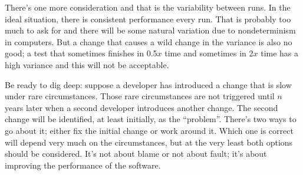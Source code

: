 There's one more consideration and that is the variability between runs. In the ideal situation, there is consistent performance every run. That is probably too much to ask for and there will be some natural variation due to nondeterminism in computers. But a change that causes a wild change in the variance is also no good; a test that sometimes finishes in 0.5$x$ time and sometimes in 2$x$ time has a high variance and this will not be acceptable. 

Be ready to dig deep: suppose a developer has introduced a change that is slow under rare circumstances. Those rare circumstances are not triggered until $n$ years later when a second developer introduces another change. The second change will be identified, at least initially, as the ``problem''. There's two ways to go about it; either fix the initial change or work around it. Which one is correct will depend very much on the circumstances, but at the very least both options should be considered. It's not about blame or not about fault; it's about improving the performance of the software.





